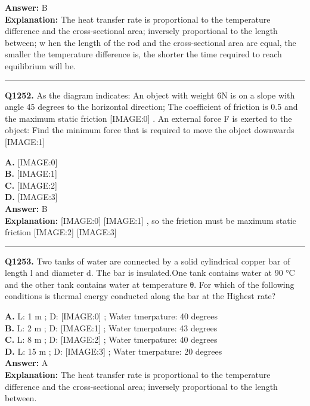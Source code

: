 \documentclass[12pt]{article}
\begin{document}
\textbf{Answer:} B \\
\textbf{Explanation:} The heat transfer rate is proportional to the temperature difference and the cross-sectional area; inversely proportional to the length between;
w
hen the length of the rod and the cross-sectional area are equal, the smaller the temperature difference is, the shorter the time required to reach equilibrium will be.

\hrule
\vspace{1em}


\noindent
\textbf{Q1252.} As the diagram indicates: An object with weight 6N is on a slope with angle 45 degrees to the horizontal direction; The coefficient of friction is 0.5 and the maximum static friction
[IMAGE:0]
. An external force F
is exerted to the object: Find the minimum force that is required to move the object downwards
[IMAGE:1]



\textbf{A.} [IMAGE:0] \\
\textbf{B.} [IMAGE:1] \\
\textbf{C.} [IMAGE:2] \\
\textbf{D.} [IMAGE:3] \\

\textbf{Answer:} B \\
\textbf{Explanation:} [IMAGE:0]
[IMAGE:1]
, so the friction must be maximum static friction
[IMAGE:2]
[IMAGE:3]

\hrule
\vspace{1em}


\noindent
\textbf{Q1253.} Two tanks of water are connected by a solid cylindrical copper bar of length l and diameter d. The bar is insulated.One tank contains water at 90 °C and the other tank
contains water at temperature θ.
For which of the following conditions is thermal energy conducted along the bar at the Highest rate?



\textbf{A.} L:
1
m
; D:
[IMAGE:0]
;
Water tmerpature: 40 degrees \\
\textbf{B.} L:
2
m
; D:
[IMAGE:1]
;
Water tmerpature: 43 degrees \\
\textbf{C.} L:
8
m
; D:
[IMAGE:2]
;
Water tmerpature: 40 degrees \\
\textbf{D.} L:
15
m
; D:
[IMAGE:3]
;
Water tmerpature: 20 degrees \\

\textbf{Answer:} A \\
\textbf{Explanation:} The heat transfer rate is proportional to the temperature difference and the cross-sectional area; inversely proportional to the length between.
\end{document}
